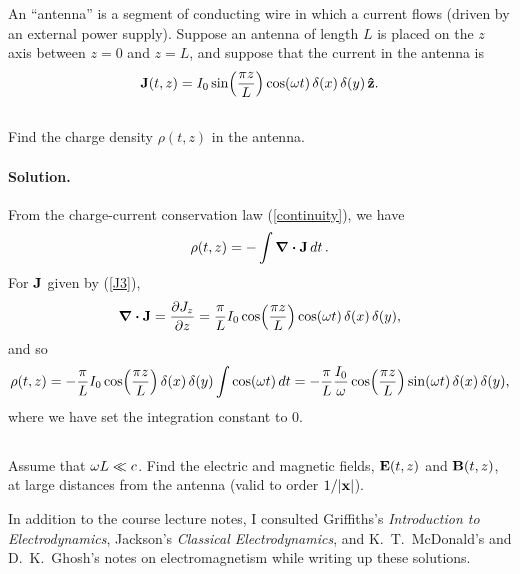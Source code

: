 \documentclass[11pt]{article}
\newcommand{\vfix}{\vspace{-\baselineskip}}
\newcommand{\refeq}[1]{(\ref{#1})}
\newcommand{\beq}{\begin{equation*}}
\newcommand{\eeq}{\end{equation*}}
\newcommand{\beqn}{\begin{equation}}
\newcommand{\eeqn}{\end{equation}}
\newenvironment{statement}[1]
{
	\section{#1}
	\color{darkgray}
	\ignorespaces
}
{
}
\newenvironment{problem}
{
	\subsection{}
	\color{darkgray}
    \ignorespaces
}
{

}
\newenvironment{solution}
{
    \paragraph{Solution.}
    \ignorespaces
}
{
    \bigskip
}
\begin{document}
\newcommand{\Io}{I_0}
\newcommand{\tz}{(t, z)}

\newcommand{\dt}{\dd{t}}

\begin{statement}{}
	An ``antenna'' is a segment of conducting wire in which a current flows (driven by an external power supply).  Suppose an antenna of length $L$ is placed on the $z$ axis between $z = 0$ and $z = L$, and suppose that the current in the antenna is
	\beqn \label{J3}
		\vJ\tz = \Io \sin(\frac{\pi z}{L}) \cos(\omg t) \,\del(x) \,\del(y) \,\zh.
	\eeqn
	\vfix
\end{statement}

\begin{problem}
	Find the charge density $\rho\tz$ in the antenna.
\end{problem}

\begin{solution}
	From the charge-current conservation law \refeq{continuity}, we have
	\beq
		\rho\tz = -\int \div{\vJ} \dt.
	\eeq
	For $\vb{J}$ given by \refeq{J3},
	\beq
		\div{\vJ} = \pdv{J_z}{z}
		= \frac{\pi}{L} \Io \cos(\frac{\pi z}{L}) \cos(\omg t) \,\del(x) \,\del(y),
	\eeq
	and so
	\beq
		\rho\tz = -\frac{\pi}{L} \Io \cos(\frac{\pi z}{L}) \,\del(x) \,\del(y) \int \cos(\omg t) \dt
		= -\frac{\pi}{L} \frac{\Io}{\omg} \cos(\frac{\pi z}{L}) \sin(\omg t) \,\del(x) \,\del(y),
	\eeq
	where we have set the integration constant to 0.
\end{solution}



\begin{problem}
	Assume that $\omega L \ll c$.  Find the electric and magnetic fields, $\vE\tz$ and $\vB\tz$, at large distances from the antenna (valid to order $1 / \abs{\vb{x}}$).
\end{problem}



\vfill
{\small In addition to the course lecture notes, I consulted Griffiths's \emph{Introduction to Electrodynamics}, Jackson's \emph{Classical Electrodynamics}, and K.~T.~McDonald's and D.~K.~Ghosh's notes on electromagnetism while writing up these solutions.}
\end{document}
